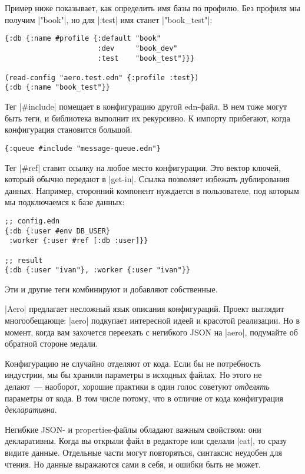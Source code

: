 Пример ниже показывает, как определить имя базы по профилю. Без профиля мы
получим \spverb|"book"|, но для \spverb|:test| имя станет \spverb|"book_test"|:

\begin{verbatim}
{:db {:name #profile {:default "book"
                      :dev     "book_dev"
                      :test    "book_test"}}}

(read-config "aero.test.edn" {:profile :test})
{:db {:name "book_test"}}
\end{verbatim}

Тег \spverb|#include| помещает в конфигурацию другой edn-файл. В нем тоже могут
быть теги, и библиотека выполнит их рекурсивно. К импорту прибегают, когда
конфигурация становится большой.

\begin{verbatim}
{:queue #include "message-queue.edn"}
\end{verbatim}

Тег \spverb|#ref| ставит ссылку на любое место конфигурации. Это вектор ключей,
который обычно передают в \spverb|get-in|. Ссылка позволяет избежать
дублирования данных. Например, сторонний компонент нуждается в пользователе, под
которым мы подключаемся к базе данных:

\begin{verbatim}
;; config.edn
{:db {:user #env DB_USER}
 :worker {:user #ref [:db :user]}}

;; result
{:db {:user "ivan"}, :worker {:user "ivan"}}
\end{verbatim}

Эти и другие теги комбинируют и добавляют собственные.

\spverb|Aero| предлагает несложный язык описания конфигураций. Проект выглядит
многообещающе: \spverb|aero| подкупает интересной идеей и красотой
реализации. Но в момент, когда вам захочется переехать с негибкого JSON на
\spverb|aero|, подумайте об обратной стороне медали.

Конфигурацию не случайно отделяют от кода. Если бы не потребность индустрии, мы
бы хранили параметры в исходных файлах. Но этого не делают~--- наоборот, хорошие
практики в один голос советуют \emph{отделять} параметры от кода. В том числе
потому, что в отличие от кода конфигурация \emph{декларативна}.

Негибкие JSON- и properties-файлы обладают важным свойством: они
декларативны. Когда вы открыли файл в редакторе или сделали \spverb|cat|, то
сразу видите данные. Отдельные части могут повторяться, синтаксис неудобен для
чтения. Но данные выражаются сами в себя, и ошибки быть не может.

